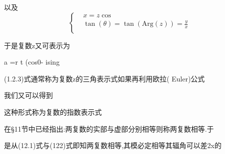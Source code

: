 	以及
	\begin{equation}
	\left\{ 
	\begin{aligned}
	{}& x = z\cos \\
	{}&\tan\left(\theta\right) = \tan\left(	\mathrm{Arg} \left(z\right)\right) = \frac{y}{x}\\
	\end{aligned}
	\right. 
	\end{equation}
	
	于是复数z又可表示为
	
	a =r t	(cos0- ising	
	
	(1.2.3)式通常称为复数z的三角表示式如果再利用欧拉( Euler)公式
	
	
	我们又可以得到
	
	
	这种形式称为复数的指数表示式
	
	在§11节中已经指出:两复数的实部与虚部分别相等则称两复数相等.于
	
	是从(12.1)式与(122)式即知两复数相等,其模必定相等其辐角可以差2x的
	
